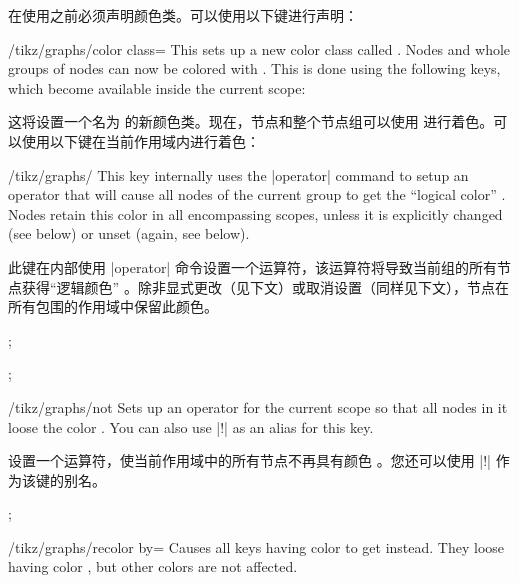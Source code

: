 在使用之前必须声明颜色类。可以使用以下键进行声明：

%
\begin{key}{/tikz/graphs/color class=}
    This sets up a new color class called . Nodes and
    whole groups of nodes can now be colored with . This
    is done using the following keys, which become
    available inside the current scope:

    这将设置一个名为  的新颜色类。现在，节点和整个节点组可以使用  进行着色。可以使用以下键在当前作用域内进行着色：
    \begin{key}{/tikz/graphs/}
        This key internally uses the |operator| command to setup an operator
        that will cause all nodes of the current group to get the ``logical
        color'' . Nodes retain this color in all
        encompassing scopes, unless it is explicitly changed (see below) or
        unset (again, see below).
        
        此键在内部使用 |operator| 命令设置一个运算符，该运算符将导致当前组的所有节点获得“逻辑颜色” 。除非显式更改（见下文）或取消设置（同样见下文），节点在所有包围的作用域中保留此颜色。
\begin{codeexample}[preamble={\usetikzlibrary{graphs}}]
\tikz {};
\end{codeexample}
\begin{codeexample}[preamble={\usetikzlibrary{graphs}}]
\tikz {};
\end{codeexample}
    \end{key}
    \begin{key}{/tikz/graphs/not }
        Sets up an operator for the current scope so that all nodes in it loose
        the color . You can also use |!| as an alias for this key.
        
        设置一个运算符，使当前作用域中的所有节点不再具有颜色 。您还可以使用 |!| 作为该键的别名。
\begin{codeexample}[preamble={\usetikzlibrary{graphs}}]
\tikz {};
\end{codeexample}
    \end{key}
    \begin{key}{/tikz/graphs/recolor  by=}
        Causes all keys having color  to get  instead. They loose having color , but
        other colors are not affected.
        

\end{key}
\end{key}
